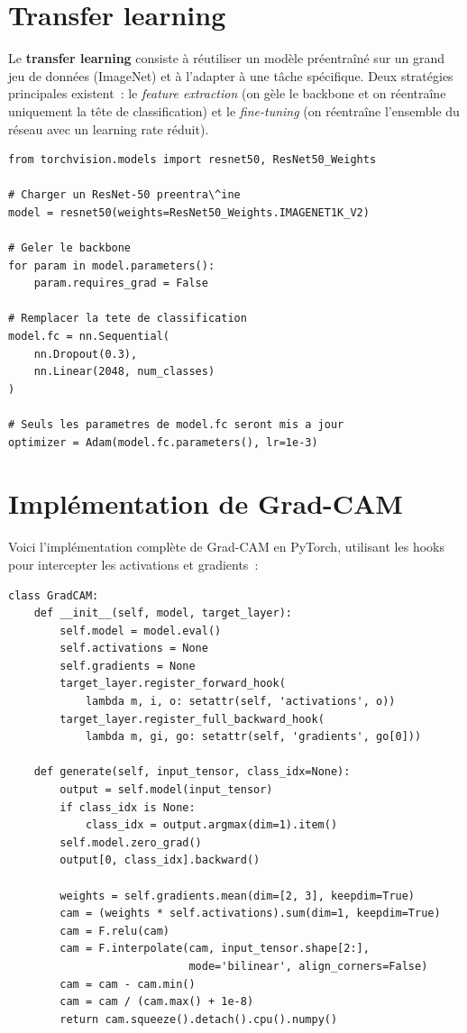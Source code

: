 \documentclass[a4paper,11pt,twoside]{book}
\begin{document}
\section{Transfer learning}

Le \textbf{transfer learning} consiste à réutiliser un modèle préentraîné sur un grand jeu de données (ImageNet) et à l'adapter à une tâche spécifique. Deux stratégies principales existent~: le \textit{feature extraction} (on gèle le backbone et on réentraîne uniquement la tête de classification) et le \textit{fine-tuning} (on réentraîne l'ensemble du réseau avec un learning rate réduit).

\begin{lstlisting}[caption={Transfer learning avec ResNet-50}]
from torchvision.models import resnet50, ResNet50_Weights

# Charger un ResNet-50 preentra\^ine
model = resnet50(weights=ResNet50_Weights.IMAGENET1K_V2)

# Geler le backbone
for param in model.parameters():
    param.requires_grad = False

# Remplacer la tete de classification
model.fc = nn.Sequential(
    nn.Dropout(0.3),
    nn.Linear(2048, num_classes)
)

# Seuls les parametres de model.fc seront mis a jour
optimizer = Adam(model.fc.parameters(), lr=1e-3)
\end{lstlisting}

\section{Implémentation de Grad-CAM}

Voici l'implémentation complète de Grad-CAM en PyTorch, utilisant les hooks pour intercepter les activations et gradients~:

\begin{lstlisting}[caption={Implémentation de Grad-CAM}]
class GradCAM:
    def __init__(self, model, target_layer):
        self.model = model.eval()
        self.activations = None
        self.gradients = None
        target_layer.register_forward_hook(
            lambda m, i, o: setattr(self, 'activations', o))
        target_layer.register_full_backward_hook(
            lambda m, gi, go: setattr(self, 'gradients', go[0]))

    def generate(self, input_tensor, class_idx=None):
        output = self.model(input_tensor)
        if class_idx is None:
            class_idx = output.argmax(dim=1).item()
        self.model.zero_grad()
        output[0, class_idx].backward()

        weights = self.gradients.mean(dim=[2, 3], keepdim=True)
        cam = (weights * self.activations).sum(dim=1, keepdim=True)
        cam = F.relu(cam)
        cam = F.interpolate(cam, input_tensor.shape[2:],
                            mode='bilinear', align_corners=False)
        cam = cam - cam.min()
        cam = cam / (cam.max() + 1e-8)
        return cam.squeeze().detach().cpu().numpy()
\end{lstlisting}
\end{document}
